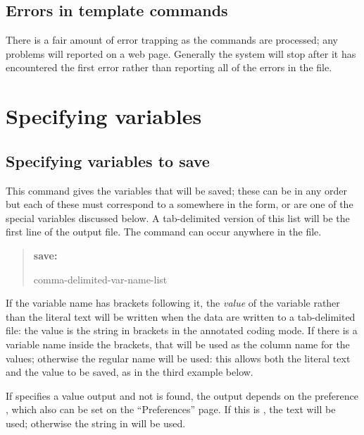 \documentclass[letterpaper,10pt,english]{sphinxmanual}
\begin{document}
\subsection{Errors in template commands}
\label{forms:errors-in-template-commands}
There is a fair amount of error trapping as the commands are processed;
any problems will reported on a web page. Generally the system will
stop after it has encountered the first error rather than reporting
all of the errors in the file.


\section{Specifying variables}
\label{forms:specifying-variables}

\subsection{Specifying variables to save}
\label{forms:specifying-variables-to-save}
This command gives the variables that will be saved; these can be in any
order but each of these must correspond to a  somewhere in
the form, or are one of the special variables discussed below. A
tab-delimited version of this list will be the first line of the output
file. The command can occur anywhere in the file.
\begin{quote}

\begin{DUlineblock}{0em}
\item[] \textbf{save:}
\item[] comma-delimited-var-name-list
\end{DUlineblock}
\end{quote}

If the variable name has brackets following it, the \emph{value} of the
variable rather than the literal text will be written when the data are
written to a tab-delimited file: the value is the string in brackets
\code{{[}…{]}} in the annotated coding mode. If there is a variable name inside
the brackets, that will be used as the column name for the values;
otherwise the regular name will be used: this allows both the literal
text and the value to be saved, as in the third example below.

If  specifies a value output and not is found, the output depends
on the preference , which also can
be set on the “Preferences” page. If this is , the text will be
used; otherwise the string in   will be used.
\end{document}
